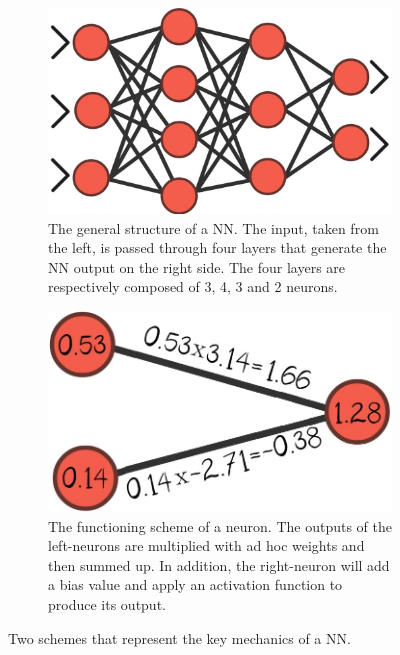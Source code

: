 \begin{figure}[!h]
	\centering
	\begin{subfigure}{0.49\textwidth}
		\includegraphics[width=\linewidth]{images/introduction/howItWorks_NN_layers}
		\captionsetup{margin=0.5cm}
		\caption{The general structure of a NN. The input, taken from the left, is passed through four layers that generate the NN output on the right side. The four layers are respectively composed of 3, 4, 3 and 2 neurons.}
		\label{fig:howItWorks_NNlayers}
	\end{subfigure}
	\begin{subfigure}{0.49\textwidth}
		\includegraphics[width=\linewidth]{images/introduction/howItWorks_NN_neutron}
		\caption{The functioning scheme of a neuron. The outputs of the left-neurons are multiplied with ad hoc weights and then summed up. In addition, the right-neuron will add a bias value and apply an activation function to produce its output.}
		\label{fig:howItWorks_neutron}
	\end{subfigure}
	\captionsetup{margin=0.5cm}
	\caption{Two schemes that represent the key mechanics of a NN.}
	\label{fig:howItWorks_NN}
\end{figure}

